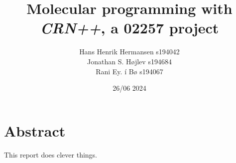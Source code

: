 \documentclass[11pt,a4paper]{article}
\title{Molecular programming with \textit{CRN++}, a 02257 project}
\author{
    Hans Henrik Hermansen s194042\\
    Jonathan S. Højlev s194684\\
    Rani Ey. í Bø s194067}
\date{26/06 2024}
\begin{document}

\maketitle
\section{Abstract}
This report does clever things. 


\newpage







\newpage

\end{document}
